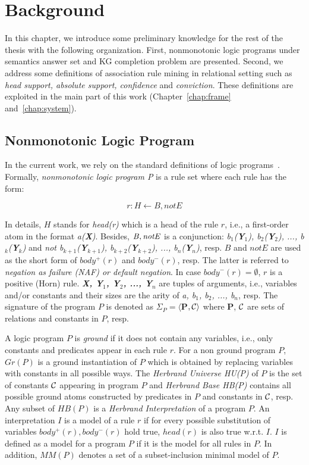 \chapter{Background}
\label{chap:back}

In this chapter, we introduce some preliminary knowledge for the rest of the thesis with the following organization. First, nonmonotonic logic programs under semantics answer set and KG completion problem are presented. Second, we address some definitions of association rule mining in relational setting such as \textit{head support, absolute support, confidence} and \textit{conviction}. These definitions are exploited in the main part of this work (Chapter~\ref{chap:frame} and~\ref{chap:system}).

\section{Nonmonotonic Logic Program}

In the current work, we rely on the standard definitions of logic programs~\cite{ref49}. Formally, \textit{nonmonotonic logic program P} is a rule set where each rule has the form:

\begin{equation}
r: H \leftarrow B, not E
\end{equation}
\label{rule3}

In details, $H$ stands for \textit{head(r)} which is a head of the rule $r$, i.e., a first-order atom in the format \textit{a(\textbf{X})}. Besides, $\mathit{B, not E}$ is a conjunction: \textit{b$_1$(\textbf{Y}$_1$), b$_2$(\textbf{Y}$_2$), ..., b$_k$(\textbf{Y}$_k$)} and \textit{not b$_{k+1}$(\textbf{Y}$_{k+1}$), b$_{k+2}$(\textbf{Y}$_{k+2}$), ..., b$_n$(\textbf{Y}$_n$)}, resp. $B$ and $not E$ are used as the short form of $body^+(r)$ and $body^-(r)$, resp. The latter is referred to \textit{negation as failure (NAF) or default negation}. In case $body^-(r) = \emptyset$, $r$ is a positive (Horn) rule. \textit{\textbf{X, Y$_{1}$, Y$_{2}$, ..., Y$_{n}$}} are tuples of arguments, i.e., variables and/or constants and their sizes are the arity of \textit{a, b$_1$, b$_2$, ..., b$_n$}, resp. The signature of the program $P$ is denoted as $\Sigma_{P} = \langle$\textbf{P}$, \mathcal{C}\rangle$ where \textbf{P}, $\mathcal{C}$ are sets of relations and constants in $P$, resp.

A logic program $P$ is \textit{ground} if it does not contain any variables, i.e., only constants and predicates appear in each rule $r$. For a non ground program $P$, $Gr(P)$ is a ground instantiation of $P$ which is obtained by replacing variables with constants in all possible ways. The \textit{Herbrand Universe HU(P)} of $P$ is the set of constants $\mathcal{C}$ appearing in program $P$ and \textit{Herbrand Base HB(P)} contains all possible ground atoms constructed by predicates in $P$ and constants in $\mathcal{C}$, resp. Any subset of $HB(P)$ is a \textit{Herbrand Interpretation} of a program $P$. An interpretation $I$ is a model of a rule $r$ if for every possible substitution of variables $body^+(r), body^-(r)$ hold true, $head(r)$ is also true w.r.t. $I$. $I$ is defined as a model for a program $P$ if it is the model for all rules in $P$. In addition, $MM(P)$ denotes a set of a subset-inclusion minimal model of $P$.

